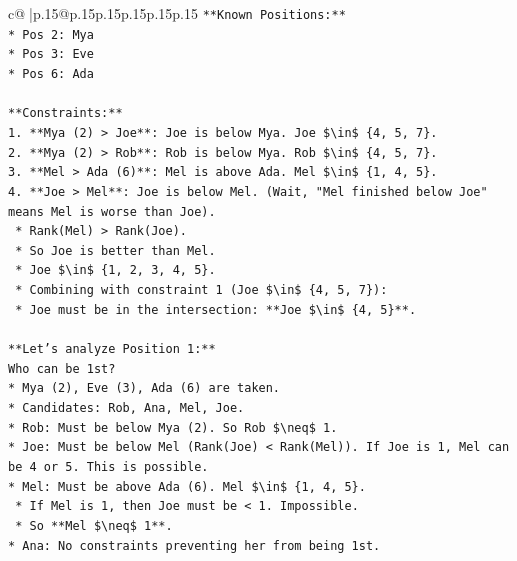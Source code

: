 \documentclass{article}
\begin{document}
{\begin{supertabular}{c@{$\;$}|p{.15\linewidth}@{}p{.15\linewidth}p{.15\linewidth}p{.15\linewidth}p{.15\linewidth}p{.15\linewidth}}
{{{\texttt{**Known Positions:**} \\
\texttt{*   Pos 2: Mya} \\
\texttt{*   Pos 3: Eve} \\
\texttt{*   Pos 6: Ada} \\
\\ 
\texttt{**Constraints:**} \\
\texttt{1.  **Mya (2) > Joe**: Joe is below Mya. Joe \$\textbackslash{}in\$ \{4, 5, 7\}.} \\
\texttt{2.  **Mya (2) > Rob**: Rob is below Mya. Rob \$\textbackslash{}in\$ \{4, 5, 7\}.} \\
\texttt{3.  **Mel > Ada (6)**: Mel is above Ada. Mel \$\textbackslash{}in\$ \{1, 4, 5\}.} \\
\texttt{4.  **Joe > Mel**: Joe is below Mel. (Wait, "Mel finished below Joe" means Mel is worse than Joe).} \\
\texttt{    *   Rank(Mel) > Rank(Joe).} \\
\texttt{    *   So Joe is better than Mel.} \\
\texttt{    *   Joe \$\textbackslash{}in\$ \{1, 2, 3, 4, 5\}.} \\
\texttt{    *   Combining with constraint 1 (Joe \$\textbackslash{}in\$ \{4, 5, 7\}):} \\
\texttt{    *   Joe must be in the intersection: **Joe \$\textbackslash{}in\$ \{4, 5\}**.} \\
\\ 
\texttt{**Let's analyze Position 1:**} \\
\texttt{Who can be 1st?} \\
\texttt{*   Mya (2), Eve (3), Ada (6) are taken.} \\
\texttt{*   Candidates: Rob, Ana, Mel, Joe.} \\
\texttt{*   Rob: Must be below Mya (2). So Rob \$\textbackslash{}neq\$ 1.} \\
\texttt{*   Joe: Must be below Mel (Rank(Joe) < Rank(Mel)). If Joe is 1, Mel can be 4 or 5. This is possible.} \\
\texttt{*   Mel: Must be above Ada (6). Mel \$\textbackslash{}in\$ \{1, 4, 5\}.} \\
\texttt{    *   If Mel is 1, then Joe must be < 1. Impossible.} \\
\texttt{    *   So **Mel \$\textbackslash{}neq\$ 1**.} \\
\texttt{*   Ana: No constraints preventing her from being 1st.} \\
\\ 
}}}
\end{supertabular}}
\end{document}
